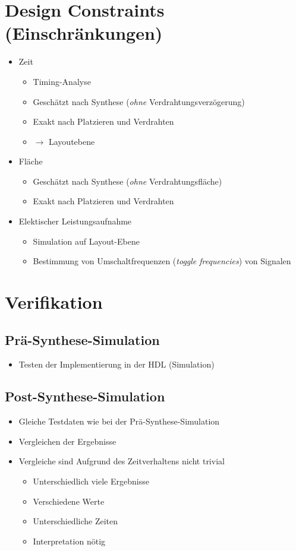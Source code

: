 	\section{Design Constraints (Einschränkungen)}
		\begin{itemize}
			\item Zeit
				\begin{itemize}
					\item Timing-Analyse
					\item Geschätzt nach Synthese (\textit{ohne} Verdrahtungsverzögerung)
					\item Exakt nach Platzieren und Verdrahten
					\item $ \rightarrow $ Layoutebene
				\end{itemize}
			\item Fläche
				\begin{itemize}
					\item Geschätzt nach Synthese (\textit{ohne} Verdrahtungsfläche)
					\item Exakt nach Platzieren und Verdrahten
				\end{itemize}
			\item Elektischer Leistungsaufnahme
				\begin{itemize}
					\item Simulation auf Layout-Ebene
					\item Bestimmung von Umschaltfrequenzen (\textit{toggle frequencies}) von Signalen
				\end{itemize}
		\end{itemize}
	
	\section{Verifikation}
		\subsection{Prä-Synthese-Simulation}
			\begin{itemize}
				\item Testen der Implementierung in der HDL (Simulation)
			\end{itemize}
		
		\subsection{Post-Synthese-Simulation}
			\begin{itemize}
				\item Gleiche Testdaten wie bei der Prä-Synthese-Simulation
				\item Vergleichen der Ergebnisse
				\item Vergleiche sind Aufgrund des Zeitverhaltens nicht trivial
					\begin{itemize}
						\item Unterschiedlich viele Ergebnisse
						\item Verschiedene Werte
						\item Unterschiedliche Zeiten
						\item Interpretation nötig
					\end{itemize}
			\end{itemize}
		
